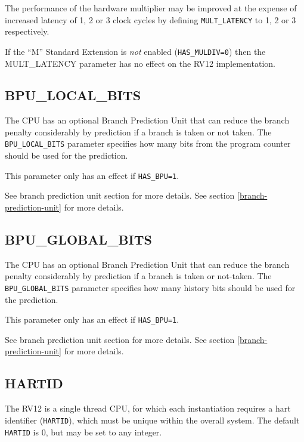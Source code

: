 The performance of the hardware multiplier may be improved at the expense of
increased latency of 1, 2 or 3 clock cycles by defining \texttt{MULT\_LATENCY}
to 1, 2 or 3 respectively.

If the ``M'' Standard Extension is \emph{not} enabled (\texttt{HAS\_MULDIV=0})
then the MULT\_LATENCY parameter has no effect on the RV12
implementation.

\subsection{BPU\_LOCAL\_BITS}\label{bpu_local_bits}

The CPU has an optional Branch Prediction Unit that can reduce the branch
penalty considerably by prediction if a branch is taken or not taken. The
\texttt{BPU\_LOCAL\_BITS} parameter specifies how many bits from the program
counter should be used for the prediction.

This parameter only has an effect if \texttt{HAS\_BPU=1}.

\ifdefined\MARKDOWN
See branch prediction unit section for more details.
\else
See section \ref{branch-prediction-unit}  for more details.
\fi

\subsection{BPU\_GLOBAL\_BITS}\label{bpu_global_bits}

The CPU has an optional Branch Prediction Unit that can reduce the branch
penalty considerably by prediction if a branch is taken or not-taken. The
\texttt{BPU\_GLOBAL\_BITS} parameter specifies how many history bits should be
used for the prediction.

This parameter only has an effect if \texttt{HAS\_BPU=1}.

\ifdefined\MARKDOWN
See branch prediction unit section for more details.
\else
See section \ref{branch-prediction-unit}  for more details.
\fi

\subsection{HARTID}\label{hartid}

The RV12 is a single thread CPU, for which each instantiation requires a hart
identifier (\texttt{HARTID}), which must be unique within the overall system.
The default \texttt{HARTID} is 0, but may be set to any integer.

